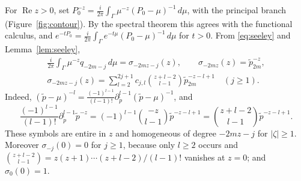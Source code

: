 \documentclass[11pt,oneside,reqno]{article}
\theoremstyle{plain}
\theoremstyle{definition}
\theoremstyle{remark}
\begin{document}
For \(\operatorname{Re}z>0\), set
\(P_0^{-z}=\frac{i}{2\pi}\int_\Gamma\mu^{-z}(P_0-\mu)^{-1}\,d\mu\), with the
principal branch (Figure~\ref{fig:contour}). By the spectral theorem this
agrees with the functional calculus, and \(e^{-tP_0}=\frac{i}{2\pi}\int_\Gamma e^{-t\mu}(P_0-\mu)^{-1}
\,d\mu\) for \(t>0\). From \eqref{eq:seeley} and Lemma~\ref{lem:seeley},
\begin{gather*}
 \frac{i}{2\pi}\int_\Gamma\mu^{-z}q_{-2m-j}\,d\mu=\sigma_{-2mz-j}(z),\qquad
 \sigma_{-2mz}(z)=\tilde p_{2m}^{-z},\\
 \sigma_{-2mz-j}(z)=\sum_{l=2}^{2j+1}c_{j,l}\binom{z+l-2}{l-1}
 \tilde p_{2m}^{-z-l+1}\quad(j\geq1).
\end{gather*}
Indeed, \((\tilde p-\mu)^{-l}=\frac{(-1)^{l-1}}{(l-1)!}\partial_{\tilde p}^{l-1}
(\tilde p-\mu)^{-1}\), and
\[
 \frac{(-1)^{l-1}}{(l-1)!}\partial_{\tilde p}^{l-1}\tilde p^{-z}
 =(-1)^{l-1}\binom{-z}{l-1}\tilde p^{-z-l+1}
 =\binom{z+l-2}{l-1}\tilde p^{-z-l+1}.
\]
These symbols are entire in \(z\)
and homogeneous of degree \(-2mz-j\) for \(|\zeta|\geq1\). Moreover
\(\sigma_{-j}(0)=0\) for \(j\geq1\), because only \(l\geq2\) occurs and
\(\binom{z+l-2}{l-1}=z(z+1)\cdots(z+l-2)/(l-1)!\) vanishes at \(z=0\); and
\(\sigma_0(0)=1\).
\end{document}
